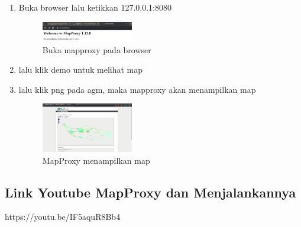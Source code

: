 \begin{enumerate}
  \item Buka browser lalu ketikkan 127.0.0.1:8080
  \hfill\break
  \begin{figure}[H]
  \includegraphics[width=4cm]{figures/tugas4/1174066/19.jpg}
  \centering
  \caption{Buka mapproxy pada browser}
  \end{figure}

  \item lalu klik demo untuk melihat map
  \item lalu klik png pada agm, maka mapproxy akan menampilkan map
  \hfill\break
  \begin{figure}[H]
  \includegraphics[width=4cm]{figures/tugas4/1174066/20.jpg}
  \centering
  \caption{MapProxy menampilkan map}
  \end{figure}

\end{enumerate}

\subsection{Link Youtube MapProxy dan Menjalankannya}
https://youtu.be/IF5aquR8Bb4
